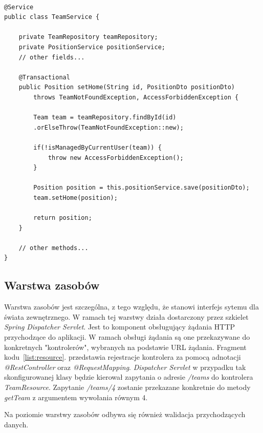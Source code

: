 \begin{minipage}{\linewidth}
\begin{lstlisting}[label=list:service, caption=Fragment serwisu TeamService, basicstyle=\footnotesize\ttfamily]

@Service
public class TeamService {

    private TeamRepository teamRepository;
    private PositionService positionService;
    // other fields...
    
    @Transactional
    public Position setHome(String id, PositionDto positionDto) 
    	throws TeamNotFoundException, AccessForbiddenException {
    
        Team team = teamRepository.findById(id)
        .orElseThrow(TeamNotFoundException::new);
        
        if(!isManagedByCurrentUser(team)) {
            throw new AccessForbiddenException();
        }

        Position position = this.positionService.save(positionDto);
        team.setHome(position);

        return position;
    }
    
    // other methods...
}
\end{lstlisting}
\end{minipage}


\subsection{Warstwa zasobów}

Warstwa zasobów jest szczególna, z tego względu, że stanowi interfejs sytemu dla świata zewnętrznego. W ramach tej warstwy działa dostarczony przez szkielet \textit{Spring} \textit{Dispatcher Servlet}. Jest to komponent obsługujący żądania HTTP przychodzące do aplikacji. W ramach obsługi żądania są one przekazywane do konkretnych "kontrolerów", wybranych na podstawie URL żądania. Fragment kodu~\ref{list:resource}. przedstawia rejestracje kontrolera za pomocą adnotacji \textit{@RestController} oraz \textit{@RequestMapping}. \textit{Dispatcher Servlet} w przypadku tak skonfigurowanej klasy będzie kierował zapytania o adresie \textit{/teams} do kontrolera \textit{TeamResource}. Zapytanie \textit{/teams/4}  zostanie przekazane konkretnie do metody \textit{getTeam} z argumentem wywołania równym 4.

Na poziomie warstwy zasobów odbywa się również walidacja przychodzących danych.

